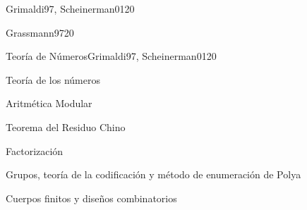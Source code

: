 \begin{sumilla}
\begin{unit}{\ALNUEVEDef}{Grimaldi97, Scheinerman01}{20}
   \begin{topicos}
         \item  \ALNUEVEDef
         \item  \ALNUEVETopicRevision
         \item  \ALNUEVETopicCriptografia
        \item   \ALNUEVETopicCriptografiade
        \item   \ALNUEVETopicFirmas
        \item   \ALNUEVETopicProtocolos
        \item   \ALNUEVETopicAplicaciones
   \end{topicos}

   \begin{objetivos}
         \item \ALNUEVEObjUNO
         \item \ALNUEVEObjDOS
          \item \ALNUEVEObjTRES
   \end{objetivos}
\end{unit}

\begin{unit}{\IMCUATRODef}{Grassmann97}{20}
   \begin{topicos}
         \item \IMCUATRODef
         \item \IMCUATROTopicMapeo
         \item \IMCUATROTopicEntidad
         \item \IMCUATROTopicAlgebra
   \end{topicos}

   \begin{objetivos}
         \item \IMCUATROObjUNO
         \item \IMCUATROObjDOS
         \item \IMCUATROObjTRES
         \item \IMCUATROObjCUATRO
         \item \IMCUATROObjCINCO
   \end{objetivos}
\end{unit}

\begin{unit}{Teor\'ia de N\'umeros}{Grimaldi97, Scheinerman01}{20}
   \begin{topicos}
      \item Teor\'ia de los n\'umeros
     \item Aritm\'etica  Modular
      \item Teorema del Residuo Chino
       \item Factorizaci\'on
      \item Grupos, teor\'ia de la codificaci\'on y m\'etodo de enumeraci\'on de Polya
      \item Cuerpos finitos y dise\~nos combinatorios
   \end{topicos}


\end{unit}
\end{sumilla}
